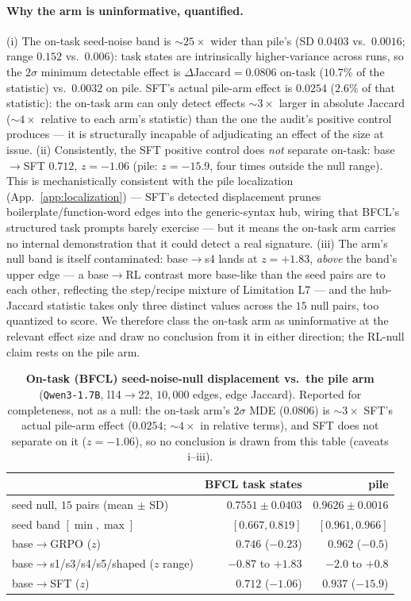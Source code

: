 \documentclass{article}
\begin{document}
\paragraph{Why the arm is uninformative, quantified.} (i) The on-task seed-noise band is ${\sim}25\times$ wider than pile's (SD $0.0403$ vs.\ $0.0016$; range $0.152$ vs.\ $0.006$): task states are intrinsically higher-variance across runs, so the $2\sigma$ minimum detectable effect is $\Delta\text{Jaccard}=0.0806$ on-task ($10.7\%$ of the statistic) vs.\ $0.0032$ on pile. SFT's actual pile-arm effect is $0.0254$ ($2.6\%$ of that statistic): the on-task arm can only detect effects ${\sim}3\times$ larger in absolute Jaccard (${\sim}4\times$ relative to each arm's statistic) than the one the audit's positive control produces --- it is structurally incapable of adjudicating an effect of the size at issue. (ii) Consistently, the SFT positive control does \emph{not} separate on-task: base$\to$SFT $0.712$, $z=-1.06$ (pile: $z=-15.9$, four times outside the null range). This is mechanistically consistent with the pile localization (App.~\ref{app:localization}) --- SFT's detected displacement prunes boilerplate/function-word edges into the generic-syntax hub, wiring that BFCL's structured task prompts barely exercise --- but it means the on-task arm carries no internal demonstration that it could detect a real signature. (iii) The arm's null band is itself contaminated: base$\to$s4 lands at $z=+1.83$, \emph{above} the band's upper edge --- a base$\to$RL contrast more base-like than the seed pairs are to each other, reflecting the step/recipe mixture of Limitation L7 --- and the hub-Jaccard statistic takes only three distinct values across the $15$ null pairs, too quantized to score. We therefore class the on-task arm as uninformative at the relevant effect size and draw no conclusion from it in either direction; the RL-null claim rests on the pile arm.

\begin{table}[h]
\centering
\caption{\textbf{On-task (BFCL) seed-noise-null displacement vs.\ the pile arm} (\texttt{Qwen3-1.7B}, l14$\to$22, $10{,}000$ edges, edge Jaccard). Reported for completeness, not as a null: the on-task arm's $2\sigma$ MDE ($0.0806$) is ${\sim}3\times$ SFT's actual pile-arm effect ($0.0254$; ${\sim}4\times$ in relative terms), and SFT does not separate on it ($z=-1.06$), so no conclusion is drawn from this table (caveats i--iii).}
\label{tab:ontask_rewiring}
\small
\begin{tabular}{lrr}
\toprule
 & BFCL task states & pile \\
\midrule
seed null, $15$ pairs (mean $\pm$ SD) & $0.7551\pm0.0403$ & $0.9626\pm0.0016$ \\
seed band $[\min,\max]$ & $[0.667, 0.819]$ & $[0.961, 0.966]$ \\
base$\to$GRPO ($z$) & $0.746$ ($-0.23$) & $0.962$ ($-0.5$) \\
base$\to$s1/s3/s4/s5/shaped ($z$ range) & $-0.87$ to $+1.83$ & $-2.0$ to $+0.8$ \\
base$\to$SFT ($z$) & $0.712$ ($-1.06$) & $\mathbf{0.937}$ ($\mathbf{-15.9}$) \\
\bottomrule
\end{tabular}
\end{table}
\end{document}
